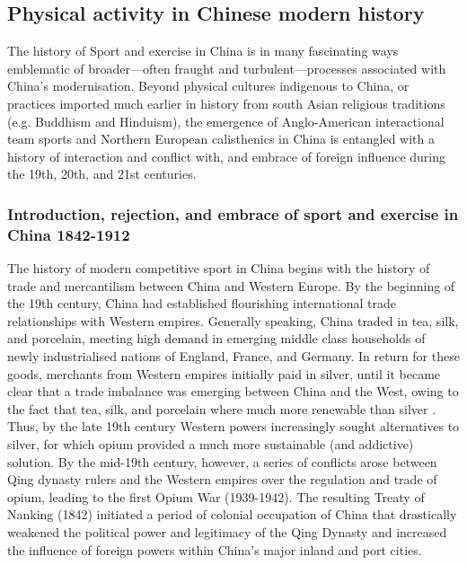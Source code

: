 {\subsection{Physical activity in Chinese modern history}
The history of Sport and exercise in China is in many fascinating ways emblematic of broader---often fraught and turbulent---processes associated with China's modernisation.  Beyond physical cultures indigenous to China, or practices imported much earlier in history from south Asian religious traditions (e.g. Buddhism and Hinduism), the emergence of Anglo-American interactional team sports and Northern European calisthenics in China is entangled with a history of interaction and conflict with, and embrace of foreign influence during the 19th, 20th, and 21st centuries.

  \subsubsection{Introduction, rejection, and embrace of sport and exercise in China 1842-1912}

The history of modern competitive sport in China begins with the history of trade and mercantilism between China and Western Europe.
By the beginning of the 19th century, China had established flourishing international trade relationships with Western empires.  Generally speaking, China traded in tea, silk, and porcelain, meeting high demand in emerging middle class households of newly industrialised nations of England, France, and Germany.  In return for these goods, merchants from Western empires initially paid in silver, until it became clear that a trade imbalance was emerging between China and the West, owing to the fact that tea, silk, and porcelain where much more renewable than silver \citep{Fay2005}.  Thus, by the late 19th century Western powers increasingly sought alternatives to silver, for which opium provided a much more sustainable (and addictive) solution.  By the mid-19th century, however, a series of conflicts arose between Qing dynasty rulers and the Western empires over the regulation and trade of opium, leading to the first Opium War (1939-1942).  The resulting Treaty of Nanking (1842) initiated a period of colonial occupation of China that drastically weakened the political power and legitimacy of the Qing Dynasty and increased the influence of foreign powers within China's major inland and port cities.

}

